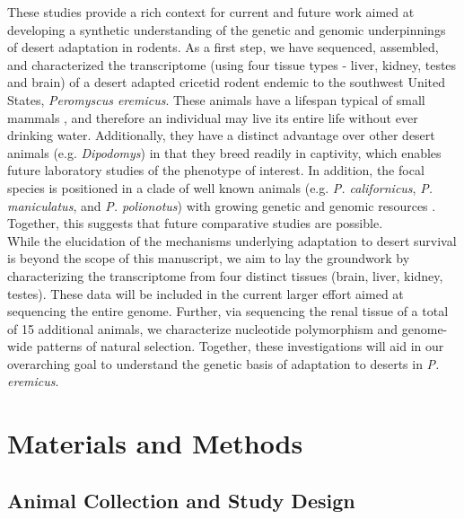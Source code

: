 \documentclass[12pt]{article}
\begin{document}
These studies provide a rich context for current and future work aimed at developing a synthetic understanding of the genetic and genomic underpinnings of desert adaptation in rodents. As a first step, we have sequenced, assembled, and characterized the transcriptome (using four tissue types - liver, kidney, testes and brain) of a desert adapted cricetid rodent endemic to the southwest United States, \textit{Peromyscus eremicus}. These animals have a lifespan typical of small mammals \citep{Veal:2001vp}, and therefore an individual may live its entire life without ever drinking water. Additionally, they have a distinct advantage over other desert animals (e.g. \textit{Dipodomys}) in that they breed readily in captivity, which enables future laboratory studies of the phenotype of interest. In addition, the focal species is positioned in a clade of well known animals (e.g. \textit{P. californicus}, \textit{P. maniculatus}, and \textit{P. polionotus}) \citep{Bradley:2007jo} with growing genetic and genomic resources \citep{Shorter:2014kw,Panhuis:2011co,Shorter:2012ib}. Together, this suggests that future comparative studies are possible. \\

While the elucidation of the mechanisms underlying adaptation to desert survival is beyond the scope of this manuscript, we aim to lay the groundwork by characterizing the transcriptome from four distinct tissues (brain, liver, kidney, testes). These data will be included in the current larger effort aimed at sequencing the entire genome. Further, via sequencing the renal tissue of a total of 15 additional animals, we characterize nucleotide polymorphism and genome-wide patterns of natural selection. Together, these investigations will aid in our overarching goal to understand the genetic basis of adaptation to deserts in \textit{P. eremicus}.

\section*{Materials and Methods}

\subsection*{Animal Collection and Study Design}
\end{document}
